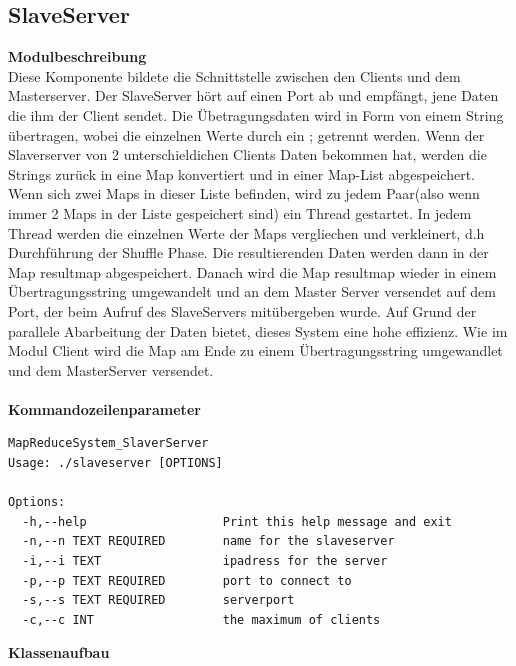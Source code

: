 \documentclass[a4paper,12pt]{article}
\begin{document}
\subsection{SlaveServer}
\textbf{Modulbeschreibung}\\
Diese Komponente bildete die Schnittstelle zwischen den Clients und dem Masterserver. Der SlaveServer hört auf einen Port ab und empfängt, jene Daten die ihm der Client sendet. Die Übetragungsdaten wird in Form von einem String übertragen, wobei die 
einzelnen Werte durch ein ; getrennt werden. Wenn der Slaverserver von 2 unterschieldichen Clients Daten bekommen hat, werden die Strings zurück in eine Map konvertiert und in einer Map-List abgespeichert. Wenn sich zwei Maps in dieser Liste befinden, wird zu jedem Paar(also wenn immer 2 Maps in der Liste gespeichert sind)
ein Thread gestartet. In jedem Thread werden die einzelnen Werte der Maps vergliechen und verkleinert, d.h Durchführung der Shuffle Phase. Die resultierenden Daten werden dann in der Map resultmap abgespeichert. Danach wird die Map resultmap wieder in einem Übertragungsstring umgewandelt und an dem Master Server versendet auf dem Port, der beim Aufruf des SlaveServers mitübergeben wurde.
Auf Grund der parallele Abarbeitung der Daten bietet, dieses System eine hohe effizienz. Wie im Modul Client wird die Map am Ende zu einem Übertragungsstring umgewandlet und dem MasterServer versendet.\\\\
\textbf{Kommandozeilenparameter}\\
\begin{verbatim}
MapReduceSystem_SlaverServer
Usage: ./slaveserver [OPTIONS]

Options:
  -h,--help                   Print this help message and exit
  -n,--n TEXT REQUIRED        name for the slaveserver
  -i,--i TEXT                 ipadress for the server
  -p,--p TEXT REQUIRED        port to connect to
  -s,--s TEXT REQUIRED        serverport
  -c,--c INT                  the maximum of clients

\end{verbatim}
\newpage
\noindent
\textbf{Klassenaufbau}\\
\end{document}
